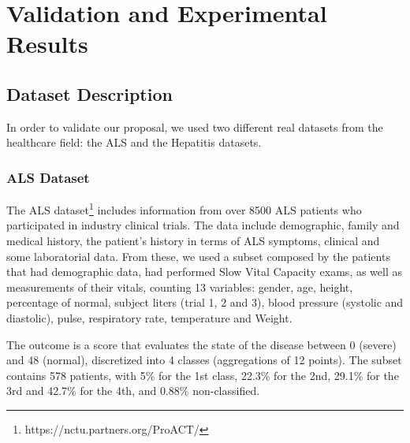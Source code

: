 
\chapter{Validation and Experimental Results}
\label{chapter:results}


\section{Dataset Description}
\label{section:datasets}
In order to validate our proposal, we used two different real datasets from the healthcare field: the ALS and the Hepatitis datasets.

\subsection{ALS Dataset}
\label{subsection:als}

The ALS dataset\footnote{https://nctu.partners.org/ProACT/} includes information from over 8500 ALS patients who participated in industry
 clinical trials. The data include demographic, family and medical history, the patient’s history in terms of ALS symptoms,
 clinical and some laboratorial data. From these, we used a subset composed by the patients that had demographic data, had 
 performed Slow Vital Capacity exams, as well as measurements of their vitals, counting 13 variables: gender, age, height, 
 percentage of normal, subject liters (trial 1, 2 and 3), blood pressure (systolic and diastolic), pulse, respiratory rate,
 temperature and Weight. 

The outcome is a score that evaluates the state of the disease between 0 (severe) and 48 (normal), discretized into 
4 classes (aggregations of 12 points). The subset contains 578 patients, with 5\% for the 1st class, 22.3\% for the 2nd,
 29.1\% for the 3rd and 42.7\% for the 4th, and 0.88\% non-classified.

